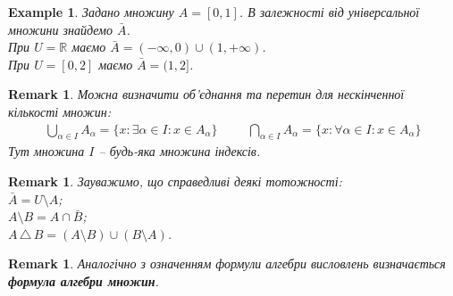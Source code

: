 \documentclass[a4paper, 14pt]{extarticle}
\theoremstyle{theoremdd}
\theoremstyle{theoremdd}
\theoremstyle{theoremdd}
\theoremstyle{theoremdd}
\theoremstyle{theoremdd}
\newtheorem{example}[theorem]{Example}
\theoremstyle{theoremdd}
\theoremstyle{theoremdd}
\theoremstyle{theoremdd}
\theoremstyle{theoremdd}
\theoremstyle{theoremdd}
\theoremstyle{theoremdd}
\newtheorem{remark}[theorem]{Remark}
\theoremstyle{theoremdd}
\theoremstyle{theoremdd}
\theoremstyle{theoremdd}
\theoremstyle{theoremdd}
\newcommand{\symdif}{\,\triangle\,} %
\begin{document}
\begin{example}
Задано множину $A = [0,1]$. В залежності від універсальної множини знайдемо $\bar{A}$.\\
При $U = \mathbb{R}$ маємо $\bar{A} = (-\infty,0) \cup (1,+\infty)$.\\
При $U = [0,2]$ маємо $\bar{A} = (1,2]$.
\end{example}

\begin{remark}
Можна визначити об'єднання та перетин для нескінченної кількості множин:
\begin{align*}
\bigcup_{\alpha \in I} A_{\alpha} = \{x: \exists \alpha \in I: x \in A_{\alpha}\} \hspace{1cm} \bigcap_{\alpha \in I} A_{\alpha} = \{x: \forall \alpha \in I: x \in A_{\alpha}\}
\end{align*}
Тут множина $I$ -- будь-яка множина індексів.
\end{remark}

\begin{remark}
Зауважимо, що справедливі деякі тотожності:\\
$\bar{A} = U \setminus A$;\\
$A \setminus B = A \cap \bar{B}$;\\
$A \symdif B = (A \setminus B) \cup (B \setminus A)$.
\end{remark}

\begin{remark}
Аналогічно з означенням формули алгебри висловлень визначається \textbf{формула алгебри множин}.
\end{remark}
\end{document}
